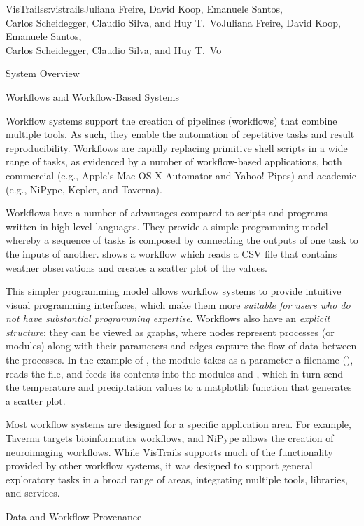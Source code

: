 \begin{aosachaptertoc}{VisTrails}{s:vistrails}{Juliana Freire, David Koop, Emanuele Santos, \\ Carlos Scheidegger, Claudio Silva, and Huy T.\ Vo}{Juliana Freire, David Koop, Emanuele Santos, \\ \hspace*{0.9cm} Carlos Scheidegger, Claudio Silva, and Huy T.\ Vo}
\begin{aosasect1}{System Overview}
\begin{aosasect2}{Workflows and Workflow-Based Systems}

Workflow systems support the creation of pipelines (workflows) that
combine multiple tools. As such, they enable the automation of
repetitive tasks and result reproducibility. Workflows are rapidly
replacing primitive shell scripts in a wide range of tasks, as
evidenced by a number of workflow-based applications, both commercial
(e.g., Apple's Mac OS X Automator and Yahoo!  Pipes) and academic
(e.g., NiPype, Kepler, and Taverna).

Workflows have a number of advantages compared to scripts and programs
written in high-level languages. They provide a simple programming
model whereby a sequence of tasks is composed by connecting the
outputs of one task to the inputs of another.
 shows a workflow which reads a CSV
file that contains weather observations and creates a scatter plot of
the values.

This simpler programming model allows workflow systems to provide
intuitive visual programming interfaces, which make them more
\emph{suitable for users who do not have substantial programming
  expertise}.  Workflows also have an \emph{explicit structure}: they
can be viewed as graphs, where nodes represent processes (or modules)
along with their parameters and edges capture the flow of data between
the processes. In the example of ,
the module  takes as a parameter a filename
(), reads the file, and feeds its
contents into the modules  and
, which in turn send the temperature and
precipitation values to a matplotlib function that generates a scatter
plot.

Most workflow systems are designed for a specific application
area. For example, Taverna targets bioinformatics workflows, and
NiPype allows the creation of neuroimaging workflows.  While VisTrails
supports much of the functionality provided by other workflow systems,
it was designed to support general exploratory tasks in a broad range
of areas, integrating multiple tools, libraries, and services.

\end{aosasect2}

\begin{aosasect2}{Data and Workflow Provenance}


\end{aosasect2}
\end{aosasect1}
\end{aosachaptertoc}
